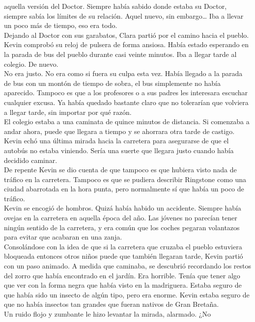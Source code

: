 aquella versión del Doctor. Siempre había sabido donde estaba su Doctor,
siempre sabía los límites de su relación. Aquel nuevo, sin
embargo\ldots{} Iba a llevar un poco más de tiempo, eso era todo.\\
Dejando al Doctor con sus garabatos, Clara partió por el camino hacia el
pueblo.\\[2\baselineskip]Kevin comprobó su reloj de pulsera de forma
ansiosa. Había estado esperando en la parada de bus del pueblo durante
casi veinte minutos. Iba a llegar tarde al colegio. De nuevo.~\\
No era justo. No era como si fuera su culpa esta vez. Había llegado a la
parada de bus con un montón de tiempo de sobra, el bus simplemente no
había aparecido. Tampoco es que a los profesores o a sus padres les
interesara escuchar cualquier excusa. Ya había quedado bastante claro
que no tolerarían que volviera a llegar tarde, sin importar por qué
razón.\\
El colegio estaba a una caminata de quince minutos de distancia. Si
comenzaba a andar ahora, puede que llegara a tiempo y se ahorrara otra
tarde de castigo.\\
Kevin echó una última mirada hacia la carretera para asegurarse de que
el autobús no estaba viniendo. Sería una suerte que llegara justo cuando
había decidido caminar.\\
De repente Kevin se dio cuenta de que tampoco es que hubiera visto nada
de tráfico en la carretera. Tampoco es que se pudiera describir
Ringstone como una ciudad abarrotada en la hora punta, pero normalmente
sí que había un poco de tráfico.\\
Kevin se encogió de hombros. Quizá había habido un accidente. Siempre
había ovejas en la carretera en aquella época del año. Las jóvenes no
parecían tener ningún sentido de la carretera, y era común que los
coches pegaran volantazos para evitar que acabaran en una zanja.\\
Consolándose con la idea de que si la carretera que cruzaba el pueblo
estuviera bloqueada entonces otros niños puede que también llegaran
tarde, Kevin partió con un paso animado. A medida que caminaba, se
descubrió recordando los restos del zorro que había encontrado en el
jardín. Era horrible. Tenía que tener algo que ver con la forma negra
que había visto en la madriguera. Estaba seguro de que había sido un
insecto de algún tipo, pero era enorme. Kevin estaba seguro de que no
había insectos tan grandes que fueran nativos de Gran Bretaña.\\
Un ruido flojo y zumbante le hizo levantar la mirada, alarmado. ¿No
